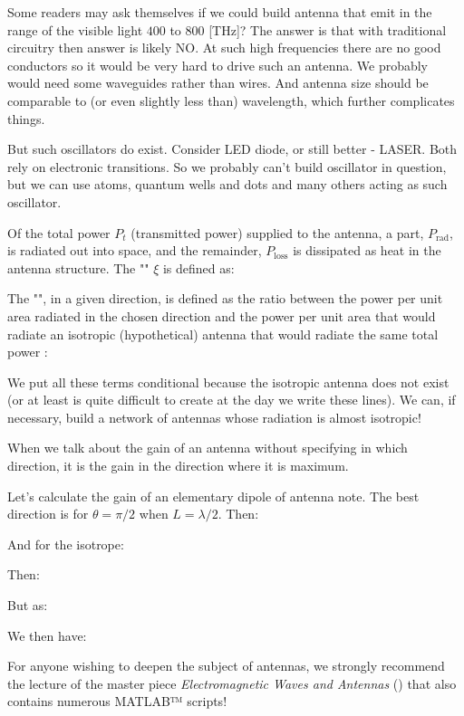 	Some readers may ask themselves if we could build antenna that emit in the range of the visible light $400$ to $800$ [THz]? The answer is that with traditional circuitry then answer is likely NO. At such high frequencies there are no good conductors so it would be very hard to drive such an antenna. We probably would need some waveguides rather than wires. And antenna size should be comparable to (or even slightly less than) wavelength, which further complicates things.
	
	But such oscillators do exist. Consider LED diode, or still better - LASER. Both rely on electronic transitions. So we probably can't build oscillator in question, but we can use atoms, quantum wells and dots and many others acting as such oscillator.
	
	Of the total power $P_t$ (transmitted power) supplied to the antenna, a part, $P_\text{rad}$, is radiated out into space, and the remainder, $P_\text{loss}$ is dissipated as heat in the antenna structure. The "" $\xi$ is defined as:
	
	The "", in a given direction, is defined as the ratio between the power per unit area radiated in the chosen direction and the power per unit area that would radiate an isotropic (hypothetical) antenna that would radiate the same total power :
	
	We put all these terms conditional because the isotropic antenna does not exist (or at least is quite difficult to create at the day we write these lines). We can, if necessary, build a network of antennas whose radiation is almost isotropic!
	
	When we talk about the gain of an antenna without specifying in which direction, it is the gain in the direction where it is maximum.
	
	Let's calculate the gain of an elementary dipole of antenna note. The best direction is for $\theta=\pi/2$ when $L=\lambda/2$. Then:
	
	And for the isotrope:
	
	Then:
	
	But as:
	
	We then have:
	
	
	\begin{tcolorbox}[title=Remark,colframe=black,arc=10pt]
	For anyone wishing to deepen the subject of antennas, we strongly recommend the lecture of the master piece \textit{Electromagnetic Waves and Antennas} (\cite{orfanidis2002electromagnetic}) that also contains numerous MATLAB™ scripts!
	\end{tcolorbox}

